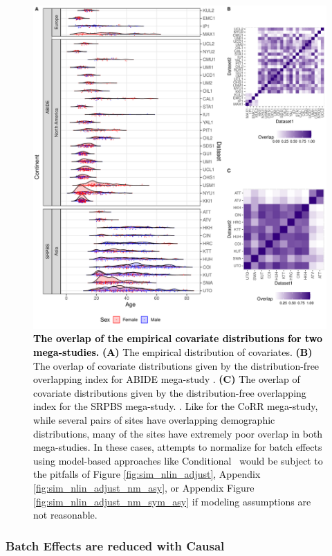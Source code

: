 {\begin{figure}[h!]
    \centering
    \includegraphics[width=\linewidth]{Figures/Supplement/mega_overlap.pdf}
    \caption{\textcolor{black}{\textbf{The overlap of the empirical covariate distributions for two mega-studies.} \textbf{(A)} The empirical distribution of covariates. \textbf{(B)} The overlap of covariate distributions given by the distribution-free overlapping index for ABIDE mega-study \cite{di2014autism, di2017enhancing}. \textbf{(C)} The overlap of covariate distributions given by the distribution-free overlapping index for the SRPBS mega-study. \cite{Yamashita2019Apr}. Like for the CoRR mega-study, while several pairs of sites have overlapping demographic distributions, many of the sites have extremely poor overlap in both mega-studies. In these cases, attempts to normalize for batch effects using model-based approaches like Conditional \Combat~would be subject to the pitfalls of Figure \ref{fig:sim_nlin_adjust}, Appendix \ref{fig:sim_nlin_adjust_nm_asy}, or Appendix Figure \ref{fig:sim_nlin_adjust_nm_sym_asy} if modeling assumptions are not reasonable.}}
    \label{fig:overlap2}
\end{figure}

\subsubsection{Batch Effects are reduced with Causal \Combat}

}
